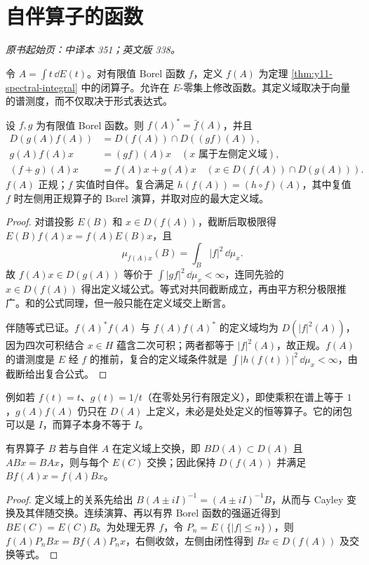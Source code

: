 \section{自伴算子的函数}\label{sec:yosida-11-12}
\noindent\textit{原书起始页：中译本 351；英文版 338。}

令 $A=\int t\,\dd E(t)$。对有限值 Borel 函数 $f$，定义 $f(A)$ 为定理 \ref{thm:y11-spectral-integral} 中的闭算子。允许在 $E$-零集上修改函数。其定义域取决于向量的谱测度，而不仅取决于形式表达式。

\begin{theorem}[无界函数演算的运算规则]\label{thm:y11-borel-calculus}
设 $f,g$ 为有限值 Borel 函数。则 $f(A)^*=\bar f(A)$，并且
\begin{align*}
 D(g(A)f(A))&=D(f(A))\cap D((gf)(A)),\\
 g(A)f(A)x&=(gf)(A)x\quad(x\text{ 属于左侧定义域}),\\
 (f+g)(A)x&=f(A)x+g(A)x\quad(x\in D(f(A))\cap D(g(A))).
\end{align*}
$f(A)$ 正规；$f$ 实值时自伴。复合满足 $h(f(A))=(h\circ f)(A)$，其中复值 $f$ 时左侧用正规算子的 Borel 演算，并取对应的最大定义域。
\end{theorem}
\begin{proof}
对谱投影 $E(B)$ 和 $x\in D(f(A))$，截断后取极限得 $E(B)f(A)x=f(A)E(B)x$，且
\[
 \mu_{f(A)x}(B)=\int_B|f|^2\,\dd\mu_x.
\]
故 $f(A)x\in D(g(A))$ 等价于 $\int|gf|^2\,\dd\mu_x<\infty$，连同先验的 $x\in D(f(A))$ 得出定义域公式。等式对共同截断成立，再由平方积分极限推广。和的公式同理，但一般只能在定义域交上断言。

伴随等式已证。$f(A)^*f(A)$ 与 $f(A)f(A)^*$ 的定义域均为 $D(|f|^2(A))$，因为四次可积结合 $x\in H$ 蕴含二次可积；两者都等于 $|f|^2(A)$，故正规。$f(A)$ 的谱测度是 $E$ 经 $f$ 的推前，复合的定义域条件就是 $\int|h(f(t))|^2\,\dd\mu_x<\infty$，由截断给出复合公式。
\end{proof}

例如若 $f(t)=t$、$g(t)=1/t$（在零处另行有限定义），即使乘积在谱上等于 $1$，$g(A)f(A)$ 仍只在 $D(A)$ 上定义，未必是处处定义的恒等算子。它的闭包可以是 $I$，而算子本身不等于 $I$。

\begin{proposition}[与谱投影交换]\label{prop:y11-commutation}
有界算子 $B$ 若与自伴 $A$ 在定义域上交换，即 $BD(A)\subset D(A)$ 且 $ABx=BAx$，则与每个 $E(C)$ 交换；因此保持 $D(f(A))$ 并满足 $Bf(A)x=f(A)Bx$。
\end{proposition}
\begin{proof}
定义域上的关系先给出 $B(A\pm iI)^{-1}=(A\pm iI)^{-1}B$，从而与 Cayley 变换及其伴随交换。连续演算、再以有界 Borel 函数的强逼近得到 $BE(C)=E(C)B$。为处理无界 $f$，令 $P_n=E(\{|f|\le n\})$，则 $f(A)P_nBx=Bf(A)P_nx$，右侧收敛，左侧由闭性得到 $Bx\in D(f(A))$ 及交换等式。
\end{proof}

